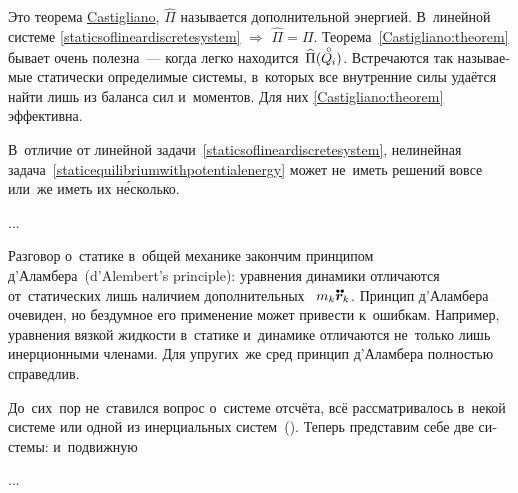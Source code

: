 \begin{otherlanguage}{russian}
\vspace{-0.1em} \noindent Это теорема \href{https://en.wikipedia.org/wiki/Carlo_Alberto_Castigliano}{Castigliano}, $\widehat{\Pi}$ называется дополнительной энергией. В~линейной системе \eqref{staticsoflineardiscretesystem} ${\Rightarrow}$ ${\widehat{\Pi} = \Pi}$. Теорема~\eqref{Castigliano:theorem} бывает очень полезна~--- когда легко находится~${\widehat{\Pi}(\mathcircabove{Q}_{\hspace{-0.1ex}i})}$. Встречаются так называемые статически определимые системы, в~которых все внутренние силы удаётся найти лишь из баланса сил и~моментов. Для них \eqref{Castigliano:theorem} эффективна.

В~отличие от линейной задачи~\eqref{staticsoflineardiscretesystem}, нелинейная задача~\eqref{staticequilibriumwithpotentialenergy} может не~иметь решений вовсе или~же иметь их н\'{е}сколько.

...

Разговор о~статике в~общей механике закончим принципом \hbox{д’\hspace{-0.2ex}Аламбера}~(\hbox{d’\hspace{-0.2ex}Alembert}’s principle): уравнения динамики отличаются от~статических лишь наличием дополнительных ~${m_k \mathdotdotabove{\bm{r}}_k}$. Принцип \hbox{д’\hspace{-0.2ex}Аламбера} очевиден, но бездумное его применение может привести к~ошибкам. Например, уравнения вязкой жидкости в~статике и~динамике отличаются не~только лишь инерционными членами. Для упругих~же сред принцип \hbox{д’\hspace{-0.2ex}Аламбера} полностью справедлив.

\end{otherlanguage}



\label{para:mechanicsofrelativemotion}

\begin{otherlanguage}{russian}

До~сих~пор не~ставился вопрос о~системе отсчёта, всё рассматривалось в~некой  системе или одной из инерциальных систем~(). Теперь представим себе две системы:  и~подвижную

...



\end{otherlanguage}

